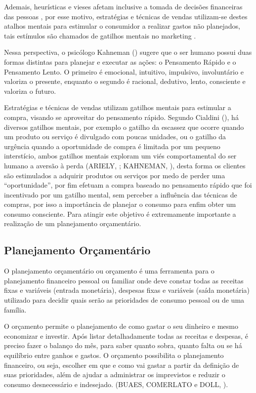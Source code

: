 Ademais, heurísticas e vieses afetam inclusive a tomada de decisões financeiras das pessoas \cite{kahneman2012}, por esse motivo, estratégias e técnicas de vendas utilizam-se destes atalhos mentais para estimular o consumidor a realizar gastos não planejados, tais estímulos são chamados de gatilhos mentais no marketing \cite{cialdini2012}.

Nessa perspectiva, o psicólogo Kahneman (\citeyear{kahneman2012}) sugere que o ser humano possui duas formas distintas para planejar e executar as ações: o Pensamento Rápido e o Pensamento Lento. O primeiro é emocional, intuitivo, impulsivo, involuntário e valoriza o presente, enquanto o segundo é racional, dedutivo, lento, consciente e valoriza o futuro.

Estratégias e técnicas de vendas utilizam gatilhos mentais para estimular a compra, visando se aproveitar do pensamento rápido. Segundo Cialdini (\citeyear{cialdini2012}), há diversos gatilhos mentais, por exemplo o gatilho da escassez que ocorre quando um produto ou serviço é divulgado com poucas unidades, ou o gatilho da urgência quando a oportunidade de compra é limitada por um pequeno interstício, ambos gatilhos mentais exploram um viés comportamental do ser humano a aversão à perda (ARIELY, \citeyear{ariely2010}; KAHNEMAN, \citeyear{kahneman2012}), desta forma os clientes são estimulados a adquirir produtos ou serviços por medo de perder uma “oportunidade”, por fim efetuam a compra baseado no pensamento rápido que foi incentivado por um gatilho mental, sem perceber a influência das técnicas de compras, por isso a importância de planejar o consumo para enfim obter um consumo consciente. Para atingir este objetivo é extremamente importante a realização de um planejamento orçamentário.

\subsection{Planejamento Orçamentário}
O planejamento orçamentário ou orçamento é uma ferramenta para o planejamento financeiro pessoal ou familiar onde deve constar todas as receitas fixas e variáveis (entrada monetária), despesas fixas e variáveis (saída monetária) utilizado para decidir quais serão as prioridades de consumo pessoal ou de uma família.

\newpage
\begin{citacao}
O orçamento permite o planejamento de como gastar o seu dinheiro e mesmo economizar e investir. Após listar detalhadamente todas as receitas e despesas, é preciso fazer o balanço do mês, para saber quanto sobra, quanto falta ou se há equilíbrio entre ganhos e gastos. O orçamento possibilita o planejamento financeiro, ou seja, escolher em que e como vai gastar a partir da definição de suas prioridades, além de ajudar a administrar os imprevistos e reduzir o consumo desnecessário e indesejado. (BUAES, COMERLATO e DOLL, \citeyear{buaes2015}).
\end{citacao} 

